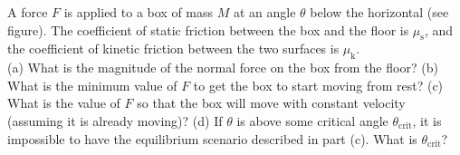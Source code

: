 A force $F$ is applied to a box of mass $M$ at an angle
$\theta$ below the horizontal (see figure). The coefficient of static
friction between the box and the floor is $\mu_\text{s}$, and the
coefficient of kinetic friction between the two surfaces is
$\mu_\text{k}$.\\
%
(a) What is the magnitude of the normal force on the box from the
floor?\hwendpart
%
(b) What is the minimum value of $F$ to get the box to
start moving from rest?\hwendpart
%
(c) What is the value of $F$ so that the box will move with
constant velocity (assuming it is already moving)?\hwendpart
%
(d) If $\theta$ is above some critical angle $\theta_\text{crit}$, it is impossible to have
the equilibrium scenario described in part (c). What is
$\theta_\text{crit}$?
